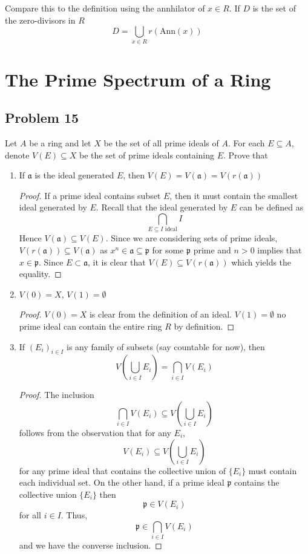 \documentclass[12pt]{article}
\begin{document}
Compare this to the definition using the annhilator of $x \in R$. If $D$ is the set of the zero-divisors in $R$
$$D = \bigcup_{x \in R} r(\text{Ann}(x))$$

\section{The Prime Spectrum of a Ring}

\subsection{Problem 15}
Let $A$ be a ring and let $X$ be the set of all prime ideals of $A$. For each $E \subseteq A$, denote $V(E) \subseteq X$ be the set of prime ideals containing $E$.
Prove that 
\begin{enumerate}
 \item If $\mathfrak{a}$ is the ideal generated $E$, then $V(E)= V(\mathfrak{a}) = V(r(\mathfrak{a}))$
 \begin{proof}
  If a prime ideal contains subset $E$, then it must contain the smallest ideal generated by $E$. Recall that the ideal generated by $E$ can be defined as 
  $$ \bigcap_{E \subseteq I \text{ ideal}} I$$ Hence $V(\mathfrak{a}) \subseteq  V(E)$. Since we are considering sets of prime ideals, $V(r(\mathfrak{a})) \subseteq  V(\mathfrak{a}) $ as $x^n \in \mathfrak{a} \subseteq \mathfrak{p}$ for some $\mathfrak{p}$ prime and $n > 0$ implies that $x \in \mathfrak{p}$. Since $E \subset \mathfrak{a}$, it is clear that $V(E) \subseteq V(r(\mathfrak{a}))$ which yields the equality.
 \end{proof}
\item $V(0) = X$, $V(1) = \emptyset$
\begin{proof}
 $V(0) = X$ is clear from the definition of an ideal. $V(1) = \emptyset$ no prime ideal can contain the entire ring $R$ by definition.
\end{proof}

\item If $(E_i)_{i \in I}$ is any family of subsets (say countable for now), then
$$ V( \bigcup_{i \in I} E_i) = \bigcap_{i \in I} V(E_i) $$
\begin{proof}
 The inclusion $$ \bigcap_{i \in I} V(E_i) \subseteq  V( \bigcup_{i \in I} E_i) $$
 follows from the observation that for any $E_i$, $$ V(E_i) \subseteq V(\bigcup_{i \in I} E_i) $$ for any prime ideal that contains the collective union of $\{E_i\}$ must contain each individual set.
 On the other hand, if a prime ideal $\mathfrak{p}$ contains the collective union $\{E_i\}$ then $$\mathfrak{p} \in V(E_i)$$ for all $i \in I$. Thus, $$ \mathfrak{p} \in \bigcap_{i \in I} V(E_i) $$ and we have the converse inclusion.
\end{proof}


\end{enumerate}
\end{document}
